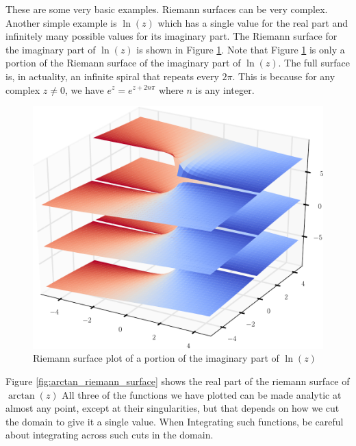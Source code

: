 These are some very basic examples.
Riemann surfaces can be very complex.
Another simple example is $\ln\left(z\right)$ which has a single value for the real part and infinitely many possible values for its imaginary part.
The Riemann surface for the imaginary part of $\ln\left(z\right)$ is shown in Figure \ref{fig:log_riemann_surface}.
Note that Figure \ref{fig:log_riemann_surface} is only a portion of the Riemann surface of the imaginary part of $\ln\left(z\right)$.
The full surface is, in actuality, an infinite spiral that repeats every $2\pi$.
This is because for any complex $z\neq 0$, we have $e^z=e^{z+2n\pi}$ where $n$ is any integer.

\begin{figure}
\includegraphics[width=\textwidth]{log_riemann_surface}
\caption{Riemann surface plot of a portion of the imaginary part of $\ln\left(z\right)$}
\label{fig:log_riemann_surface}
\end{figure}

Figure \ref{fig:arctan_riemann_surface} shows the real part of the riemann surface of $\arctan\left(z\right)$
All three of the functions we have plotted can be made analytic at almost any point, except at their singularities, but that depends on how we cut the domain to give it a single value.
When Integrating such functions, be careful about integrating across such cuts in the domain.

